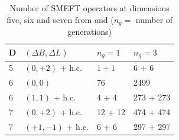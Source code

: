 \begin{table}[t]
    \centering
    \begin{tabular}{llll} \toprule
             D&$(\Delta B,\Delta L)$&$n_g=1$&$n_g=3$\\\midrule
             5&$(0,+2)$ + h.c.&$1+1$&6 + 6\\
             6&$(0,0)$&76&2499\\
             6&$(1,1)$ + h.c.&4 + 4&273 + 273\\
             7&$(0,+2)$ + h.c.&12 + 12&474 + 474\\
             7&$(+1,-1)$ + h.c.&6 + 6&297 + 297\\\bottomrule
    \end{tabular}
    \caption{Number of SMEFT operators at dimensions five, six and seven from \cite{jenkins2018lowOM} and \cite{liao2020extending} ($n_g=$ number of generations)}
    \label{tab:SMEFTnumOP}
\end{table}
